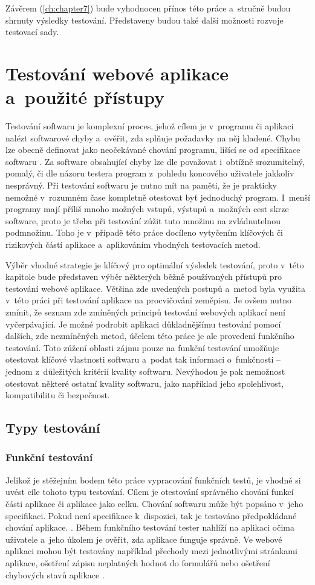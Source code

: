 \documentclass[
    color,   %
	table,   %
    twoside, %
    nolot, nolof,
]{fithesis3}
\begin{document}
Závěrem (\ref{ch:chapter7}) bude vyhodnocen přínos této práce a~stručně budou shrnuty výsledky testování. Představeny budou také další možnosti rozvoje testovací sady.

\chapter{Testování webové aplikace a~použité přístupy}
\label{ch:chapter2}
Testování softwaru je komplexní proces, jehož cílem je v~programu či aplikaci nalézt softwarové chyby a~ověřit, zda splňuje požadavky na něj kladené. Chybu lze obecně definovat jako neočekávané chování programu, lišící se od specifikace softwaru \cite{SoftwareISTQB}. Za software obsahující chyby lze dle \cite{Patton} považovat i~obtížně srozumitelný, pomalý, či dle názoru testera program z~pohledu koncového uživatele jakkoliv nesprávný. Při testování softwaru je nutno mít na paměti, že je prakticky nemožné v~rozumném čase kompletně otestovat byť jednoduchý program.  I~menší programy mají příliš mnoho možných vstupů, výstupů a~možných cest skrze software, proto je třeba při testování zúžit tuto množinu na zvládnutelnou podmnožinu. Toho je v~případě této práce docíleno vytyčením klíčových či rizikových částí aplikace a~aplikováním vhodných testovacích metod.

Výběr vhodné strategie je klíčový pro optimální výsledek testování, proto v~této kapitole bude představen výběr některých běžně používaných přístupů pro testování webové aplikace. Většina zde uvedených postupů a~metod byla využita v~této práci při testování aplikace na procvičování zeměpisu. Je ovšem nutno zmínit, že seznam zde zmíněných principů testování webových aplikací není vyčerpávající. Je možné podrobit aplikaci důkladnějšímu testování pomocí dalších, zde nezmíněných metod, účelem této práce je ale provedení funkčního testování. Toto zúžení oblasti zájmu pouze na funkční testování umožňuje otestovat klíčové  vlastnosti softwaru a~podat tak informaci o~funkčnosti – jednom z~důležitých kritérií kvality softwaru. Nevýhodou je pak nemožnost otestovat některé ostatní kvality softwaru, jako například jeho spolehlivost, kompatibilitu či bezpečnost.

\section{Typy testování}
\subsection{Funkční testování}
Jelikož je stěžejním bodem této práce vypracování funkčních testů, je vhodné si uvést cíle tohoto typu testování. Cílem je otestování správného chování funkcí části aplikace či aplikace jako celku. Chování softwaru může být popsáno v~jeho specifikaci. Pokud není specifikace k~dispozici, tak je testováno předpokládané chování aplikace. \cite{FunctionalISTQB}. Během funkčního testování tester nahlíží na aplikaci očima uživatele a~jeho úkolem je ověřit, zda aplikace funguje správně. Ve webové aplikaci mohou být testovány například přechody mezi jednotlivými stránkami aplikace, ošetření zápisu neplatných hodnot do formulářů nebo ošetření chybových stavů aplikace \cite{Patton}.
\end{document}
